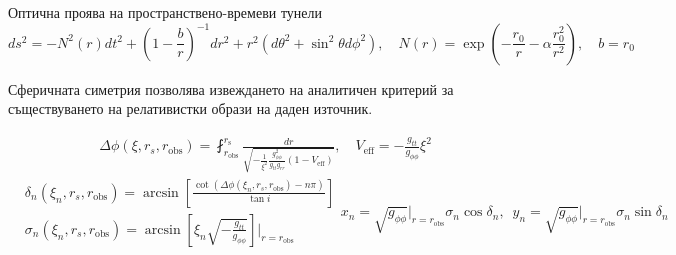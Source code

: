 \documentclass[hyperref={colorlinks,citecolor=blue,linkcolor=blue,urlcolor=blue}]{beamer}
\begin{document}
	\begin{frame}{Оптична проява на пространствено-времеви тунели}		
		\tiny
		\begin{equation*}
			ds^2 = - N^2(r)dt^2 + \left(1- \frac{b}{r}\right)^{-1}dr^2 + r^2\left(d\theta^2 + \sin^2\theta d\phi^2\right), \quad N(r) = \exp\left(-\frac{r_0}{r} -\alpha \frac{r_0^2}{r^2}\right),\quad b = r_0
		\end{equation*}	
		\small
		\begin{block}{}
			Сферичната симетрия позволява извеждането на аналитичен критерий за съществуването на релативистки образи на даден източник.
		\end{block}	
		\begin{minipage}{25em}
			\tiny	
			\begin{equation}
				\begin{aligned}
				&\Delta\phi(\xi,r_s,r_\text{obs}) = \fint_{r_\text{obs}}^{r_\text{s}}\frac{dr}{\sqrt{-\frac{1}{\xi^2}\frac{g^2_{\phi\phi}}{g_{tt}g_{rr}}(1 - V_\text{eff})}},\quad V_\text{eff} = -\frac{g_{tt}}{g_{\phi\phi}}\xi^2
				\end{aligned}
			\end{equation}
			\begin{subequations}
				\begin{equation}
					\begin{aligned}
						&\delta_n(\xi_n,r_s,r_\text{obs}) = \arcsin\left[\frac{\cot\left(\Delta\phi(\xi_n,r_s,r_\text{obs}) - n\pi\right)}{\tan i}\right]\\
						&\sigma_n(\xi_n,r_s,r_\text{obs}) = \arcsin\left[\xi_n\sqrt{-\frac{g_{tt}}{g_{\phi\phi}}}\right]\bigg\vert_{r = r_\text{obs}}
					\end{aligned}
				\end{equation}
				\begin{equation}
					\boxed{x_n = \sqrt{g_{\phi\phi}}\vert_{r=r_\text{obs}}\sigma_n\cos\delta_n,\,\,\,y_n = \sqrt{g_{\phi\phi}}\vert_{r=r_\text{obs}}\sigma_n\sin\delta_n}
				\end{equation}
			\end{subequations}
		\end{minipage}
		\begin{minipage}{6em}

\end{minipage}
\end{frame}
\end{document}
